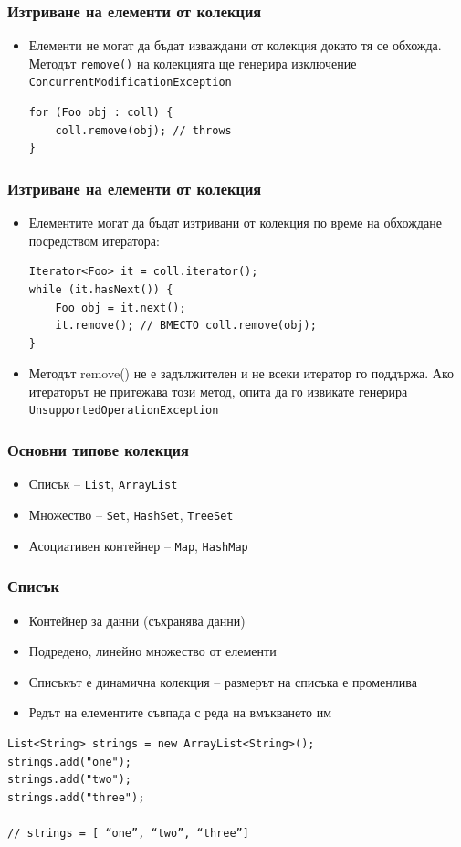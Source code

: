 \documentclass[ignorenonframetext, hyperref=unicode,compress]{beamer}
\begin{document}
\begin{frame}[containsverbatim]\frametitle{Изтриване на елементи от колекция}
\begin{itemize}
\item Елементи не могат да бъдат изваждани от колекция
докато тя се обхожда. Методът \lstinline{remove()} на колекцията ще генерира изключение {\color{blue}\lstinline{ConcurrentModificationException}}
\begin{lstlisting}
for (Foo obj : coll) {
	coll.remove(obj); // throws
}
\end{lstlisting}
\end{itemize}
\end{frame}

\begin{frame}[containsverbatim]\frametitle{Изтриване на елементи от колекция}
\begin{itemize}
\item Елементите могат да бъдат изтривани от колекция по време на обхождане
посредством итератора:
\begin{lstlisting}
Iterator<Foo> it = coll.iterator();
while (it.hasNext()) {
	Foo obj = it.next();
	it.remove(); // ВМЕСТО coll.remove(obj);
}
\end{lstlisting}
\item Методът remove() не е задължителен и не всеки итератор
 го поддържа. Ако итераторът не притежава този метод, опита да го извикате генерира  {\color{blue}\lstinline{UnsupportedOperationException}}
\end{itemize}
\end{frame}

\begin{frame}[containsverbatim]\frametitle{Основни типове колекция}
\begin{itemize}
\item Списък -- \lstinline{List}, \lstinline{ArrayList}
\item Множество -- \lstinline{Set}, \lstinline{HashSet}, \lstinline{TreeSet}
\item Асоциативен контейнер -- \lstinline{Map}, \lstinline{HashMap}
\end{itemize}
\end{frame}

\begin{frame}[containsverbatim]\frametitle{Списък}
\begin{itemize}
\item Контейнер за данни (съхранява данни)
\item Подредено, линейно множество от елементи
\item Списъкът е динамична колекция -- размерът на списъка е променлива
\item Редът на елементите съвпада с реда на вмъкването им
\end{itemize}
\begin{lstlisting}
List<String> strings = new ArrayList<String>();
strings.add("one");
strings.add("two");
strings.add("three");

// strings = [ “one”, “two”, “three”]
\end{lstlisting}
\end{frame}
\end{document}
